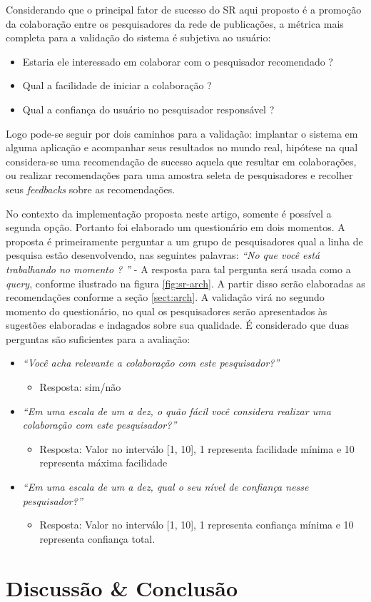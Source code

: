 \documentclass[12pt]{article}
\begin{document}
Considerando que o principal fator de sucesso do SR aqui proposto é a promoção da colaboração entre os pesquisadores da rede de 
publicações, a métrica mais completa para a validação do sistema é subjetiva ao usuário: 

\begin{itemize}
  \item Estaria ele interessado em colaborar com o pesquisador recomendado ?
  \item Qual a facilidade de iniciar a colaboração ?
  \item Qual a confiança do usuário no pesquisador responsável ?  
\end{itemize}

Logo pode-se seguir por dois caminhos para a validação: implantar o sistema em alguma aplicação e acompanhar seus resultados no 
mundo real, hipótese na qual considera-se uma recomendação de sucesso aquela que resultar em colaborações, ou realizar 
recomendações para uma amostra seleta de pesquisadores e recolher seus \textit{feedbacks} sobre as recomendações.

No contexto da implementação proposta neste artigo, somente é possível a segunda opção. Portanto foi elaborado um questionário 
em dois momentos. A proposta é primeiramente perguntar a um grupo de pesquisadores qual a linha de pesquisa estão desenvolvendo, 
nas seguintes palavras: \textit{“No que você está trabalhando no momento ? ”} - A resposta para tal pergunta será usada como a 
\textit{query}, conforme ilustrado na figura \ref{fig:sr-arch}. A partir disso serão elaboradas as recomendações conforme a seção 
\ref{sect:arch}. A validação virá no segundo momento do questionário, no qual os pesquisadores serão apresentados às sugestões 
elaboradas e indagados sobre sua qualidade. É considerado que duas perguntas são suficientes para a avaliação:

\begin{itemize}
  \item \textit{“Você acha relevante a colaboração com este pesquisador?”}
  \begin{itemize}
    \item Resposta: sim/não
  \end{itemize}
  \item \textit{“Em uma escala de um a dez, o quão fácil você considera realizar uma colaboração com este pesquisador?”}
  \begin{itemize}
    \item Resposta: Valor no interválo [1, 10], 1 representa facilidade mínima e 10 representa máxima facilidade
  \end{itemize}
  \item \textit{“Em uma escala de um a dez, qual o seu nível de confiança nesse pesquisador?”}
  \begin{itemize}
    \item Resposta: Valor no interválo [1, 10], 1 representa confiança mínima e 10 representa confiança total.  
  \end{itemize}
\end{itemize}

\section{Discussão \& Conclusão}



\end{document}
